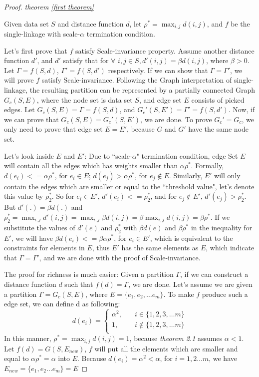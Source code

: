 \documentclass{uonmathreport}
\begin{document}
\begin{proof}
\label{pf:myproof1}
\textit{theorem \ref{first theorem}}

\noindent Given data set $S$ and distance function $d$, let $\rho^* = \max_{i,j}d(i,j)$, and $f$ be the single-linkage with scale-$\alpha$ termination condition. 

Let's first prove that $f$ satisfy Scale-invariance property. Assume another distance function $d'$, and $d'$ satisfy that for $\forall$ $i,j \in S, d'(i,j)=\beta d(i,j)$, where $\beta >0$. Let $\Gamma = f(S,d)$, $\Gamma' = f(S,d')$ respectively. If we can show that $\Gamma = \Gamma'$, we will prove $f$ satisfy Scale-invariance. Following the Graph interpretation of single-linkage, the resulting partition can be represented by a partially connected Graph $G_c(S,E)$, where the node set is data set $S$, and edge set $E$ consists of picked edges. Let $G_c(S,E) = \Gamma = f(S,d)$, and $G_c'(S,E') = \Gamma' = f(S,d')$. Now, if we can prove that $G_c(S,E) = G_c'(S,E')$, we are done. To prove $G_c' = G_c$, we only need to prove that edge set $E=E'$, because $G$ and $G'$ have the same node set.

Let's look inside $E$ and $E'$: Due to ``scale-$\alpha$" termination condition, edge Set $E$ will contain all the edges which has weights smaller than $\alpha\rho^*$. Formally, $d(e_i) <=\alpha\rho^*$, for $e_i\in E$; $d(e_j) > \alpha\rho^*$, for $e_j\notin E$. Similarly, $E'$ will only contain the edges which are smaller or equal to the ``threshold value", let's denote this value by $\rho_{2}^{*}$. So for $e_i \in E'$, $d'(e_i)<=\rho_{2}^{*}$, and for $e_j \notin E'$, $d'(e_j)>\rho_{2}^{*}$. But $d'(.) = \beta d(.)$ and $ \rho_{2}^{*} =  \max_{i,j}d'(i,j)= \max_{i,j}\beta d(i,j)=\beta \max_{i,j} d(i,j) =\beta\rho^*$. If we substitute the values of  $d'(e)$ and $\rho_{2}^{*}$ with $\beta d(e)$ and $\beta \rho^{*}$ in the inequality for $E'$, we will have $\beta d(e_i) <=\beta \alpha\rho^*$, for $e_i \in E'$, which is equivalent to the constraints for elements in $E$, thus $E'$ has the same elements as $E$, which indicate that $\Gamma = \Gamma'$, and we are done with the proof of Scale-invariance.

The proof for richness is much easier: Given a partition $\Gamma$, if we can construct a distance function $d$ such that $f(d) = \Gamma$, we are done. Let's assume we are given a partition $\Gamma = G_c(S,E)$, where $E = \{e_1,e_2,\ldots e_m\}$. To make $f$ produce such a edge set, we can define d as following: \[   
d(e_i) = 
     \begin{cases}
       \alpha^2, &\quad i\in\{1,2,3,\ldots m\} \\
       1, &\quad i\notin\{1,2,3,\ldots m\} \\
     \end{cases}
\]
In this manner, $\rho^{*} = \max_{i,j}d(i,j) = 1$, because \textit{theorem 2.1} assumes $\alpha<1$. Let $f(d) = G(S,E_{new})$, $f$ will put all the elements which are smaller and equal to $\alpha \rho^{*} = \alpha$ into $E$. Because $d(e_i)= \alpha^2 < \alpha$, for $i = 1,2\ldots m$, we have $E_{new} = \{e_1,e_2\ldots e_m\}=E$ 
\end{proof}
\end{document}
